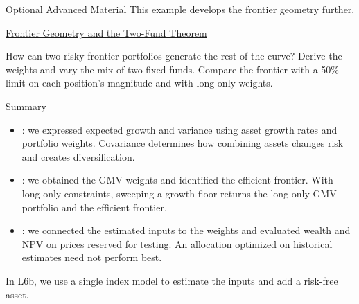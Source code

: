 \documentclass[aspectratio=169,11pt]{beamer}
\begin{document}
\begin{frame}{Optional Advanced Material}
  This example develops the frontier geometry further.

  \vspace{0.8em}
  \textbf{}
  \href{https://github.com/varnerlab/CHEME-5660-CourseRepository-Fall-2026/blob/main/lectures/week-6/L6a/advanced/frontier-geometry/CHEME-5660-L6a-Advanced-FrontierGeometry-Fall-2026.ipynb}{Frontier Geometry and the Two-Fund Theorem}

  How can two risky frontier portfolios generate the rest of the curve?
  Derive the weights and vary the mix of two fixed funds. Compare the
  frontier with a 50\% limit on each position's magnitude and with long-only
  weights.
\end{frame}

\begin{frame}{Summary}
  \begin{itemize}\setlength{\itemsep}{1.0em}
    \item {}: we expressed expected growth and
      variance using asset growth rates and portfolio weights. Covariance
      determines how combining assets changes risk and creates diversification.
    \item {}: we obtained the GMV weights and
      identified the efficient frontier. With long-only constraints, sweeping a
      growth floor returns the long-only GMV portfolio and the efficient frontier.
    \item {}: we connected the
      estimated inputs to the weights and evaluated wealth and NPV on prices
      reserved for testing. An allocation optimized on historical estimates
      need not perform best.
  \end{itemize}
  \vspace{0.7em}
  In L6b, we use a single index model to estimate the inputs and add a
  risk-free asset.
\end{frame}

\end{document}
